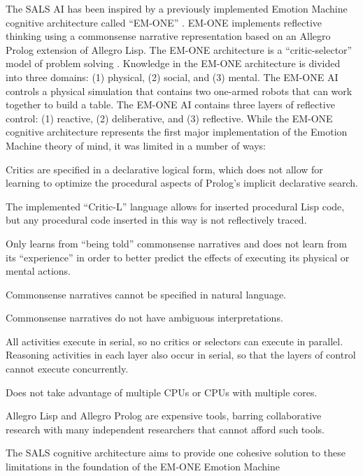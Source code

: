 The SALS AI has been inspired by a previously implemented Emotion
Machine cognitive architecture called ``EM-ONE'' \cite[]{singh:2005b}.
EM-ONE implements reflective thinking using a commonsense narrative
representation based on an Allegro Prolog extension of Allegro Lisp.
The EM-ONE architecture is a ``critic-selector'' model of problem
solving
\cite[]{sussman:1973,singh:2002a,singh:2004,singh:2005a,singh:2005b,minsky:2006,morgan:2009}.
Knowledge in the EM-ONE architecture is divided into three domains:
(1) physical, (2) social, and (3) mental.  The EM-ONE AI controls a
physical simulation that contains two one-armed robots that can work
together to build a table.  The EM-ONE AI contains three layers of
reflective control: (1) reactive, (2) deliberative, and (3)
reflective.  While the EM-ONE cognitive architecture represents the
first major implementation of the Emotion Machine theory of mind, it
was limited in a number of ways:
\begin{packed_enumerate}
\item{Critics are specified in a declarative logical form, which does
  not allow for learning to optimize the procedural aspects of
  Prolog's implicit declarative search.}
\item{The implemented ``Critic-L'' language allows for inserted
  procedural Lisp code, but any procedural code inserted in this way
  is not reflectively traced.}
\item{Only learns from ``being told'' commonsense narratives and does
  not learn from its ``experience'' in order to better predict the
  effects of executing its physical or mental actions.}
\item{Commonsense narratives cannot be specified in natural language.}
\item{Commonsense narratives do not have ambiguous interpretations.}
\item{All activities execute in serial, so no critics or selectors can
  execute in parallel.  Reasoning activities in each layer also occur
  in serial, so that the layers of control cannot execute
  concurrently.}
\item{Does not take advantage of multiple CPUs or CPUs with multiple
  cores.}
\item{Allegro Lisp and Allegro Prolog are expensive tools, barring
  collaborative research with many independent researchers that cannot
  afford such tools.}
\end{packed_enumerate}
The SALS cognitive architecture aims to provide one cohesive solution
to these limitations in the foundation of the EM-ONE Emotion Machine
